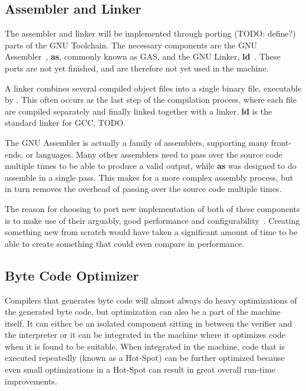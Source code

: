 \subsection{Assembler and Linker}

The assembler and linker will be implemented through porting (TODO: define?)
parts of the GNU Toolchain. The necessary components are the GNU
Assembler~\cite{gnu:as}, {\bf as}, commonly known as GAS, and the GNU Linker,
{\bf ld}~\cite{gnu:ld}. These ports are not yet finished, and are therefore not
yet used in the machine.

A linker combines several compiled object files into a single binary file,
executable by \thename{}. This often occurs as the last step of the compilation
process, where each file are compiled separately and finally linked together
with a linker. {\bf ld} is the standard linker for GCC, TODO.

The GNU Assembler is actually a family of assemblers, supporting many
front-ends, or languages. Many other assemblers need to pass over the source
code multiple times to be able to produce a valid output, while {\bf as} was
designed to do assemble in a single pass. This makes for a more complex assembly
process, but in turn removes the overhead of passing over the source code
multiple times.

The reason for choosing to port new implementation of both of these components
is to make use of their arguably, good performance and
configurability~\cite{NEEDED}. Creating something new from scratch would have
taken a significant amount of time to be able to create something that could
even compare in performance.


\subsection{Byte Code Optimizer}

Compilers that generates byte code will almost always do heavy optimizations of
the generated byte code, but optimization can also be a part of the machine
itself. It can either be an isolated component sitting in between the verifier
and the interpreter or it can be integrated in the machine where it optimizes
code when it is found to be suitable. When integrated in the machine, code that
is executed repeatedly (known as a Hot-Spot) can be further optimized because
even small optimizations in a Hot-Spot can result in great overall run-time
improvements.

